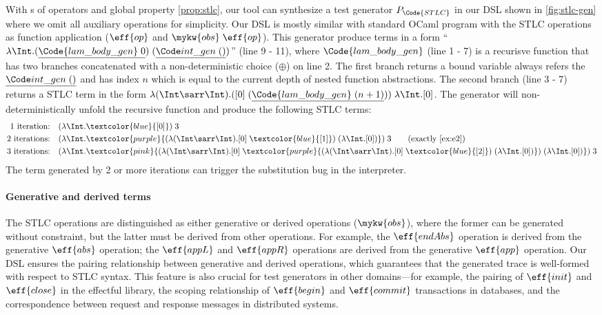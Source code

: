 With \PAT{}s of operators and global property \ref{prop:stlc}, our tool can synthesize a test generator $P_\Code{STLC}$ in our DSL shown in \autoref{fig:stlc-gen} where we omit all auxiliary operations for simplicity. Our DSL is mostly similar with standard OCaml program with the STLC operations as function application ($\eff{op}$ and $\mykw{obs}\;\eff{op}$). This generator produce terms in a form ``$\lambda \Int. (\underline{\Code{lam\_body\_gen}\;0})\;(\ranint)$'' (line 9 - 11), where $\Code{lam\_body\_gen}$ (line 1 - 7) is a recurisve function that has two branches concatenated with a non-deterministic choice ($\oplus$) on line 2. The first branch returns a bound variable always refers the $\ranint$ and has index $n$ which is equal to the current depth of nested function abstractions. The second branch (line 3 - 7) returns a STLC term in the form $\lambda (\Int\sarr\Int). ([0]\;(\underline{\Code{lam\_body\_gen}\;(n + 1)}))\;\lambda \Int. [0]$. The generator will non-deterministically unfold the recursive function and produce the following STLC terms:
\begin{align*}
  \text{1 iteration:} \quad & (\lambda \Int.\textcolor{blue}{[0]})\;3 \\
  \text{2 iterations:} \quad & (\lambda \Int. \textcolor{purple}{(\lambda (\Int\sarr\Int). [0]\;\textcolor{blue}{[1]})\; (\lambda \Int. [0])})\; 3 \tag{exactly \ref{ex:e2}}
  \\
  \text{3 iterations:} \quad & (\lambda \Int.\textcolor{pink}{(\lambda (\Int\sarr\Int). [0]\;\textcolor{purple}{(\lambda (\Int\sarr\Int). [0]\;\textcolor{blue}{[2]})\; (\lambda \Int. [0])})\; (\lambda \Int. [0])})\; 3
\end{align*}\noindent
The term generated by 2 or more iterations can trigger the substitution bug in the interpreter.

\paragraph{Generative and derived terms}
The STLC operations are distinguished as either generative or derived operations ($\mykw{obs}$), where the former can be generated without constraint, but the latter must be derived from other operations. For example, the $\eff{endAbs}$ operation is derived from the generative $\eff{abs}$ operation; the $\eff{appL}$ and $\eff{appR}$ operations are derived from the generative $\eff{app}$ operation. Our DSL ensures the pairing relationship between generative and derived operations, which guarantees that the generated trace is well-formed with respect to STLC syntax. This feature is also crucial for test generators in other domains—for example, the pairing of $\eff{init}$ and $\eff{close}$ in the effectful library, the scoping relationship of $\eff{begin}$ and $\eff{commit}$ transactions in databases, and the correspondence between request and response messages in distributed systems.

